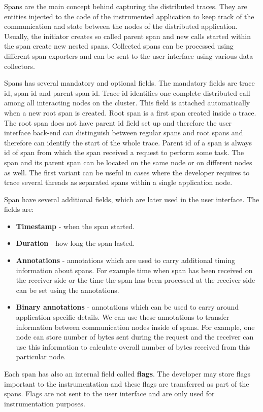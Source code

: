 Spans are the main concept behind capturing the distributed traces. They are entities injected to the code of the instrumented application to keep track of the communication and state between the nodes of the distributed application. Usually, the initiator creates so called parent span and new calls started within the span create new nested spans. Collected spans can be processed using different span exporters and can be sent to the user interface using various data collectors.

Spans has several mandatory and optional fields. The mandatory fields are trace id, span id and parent span id. Trace id identifies one complete distributed call among all interacting nodes on the cluster. This field is attached automatically when a new root span is created. Root span is a first span created inside a trace. The root span does not have parent id field set up and therefore the user interface back-end can distinguish between regular spans and root spans and therefore can identify the start of the whole trace. Parent id of a span is always id of span from which the span received a request to perform some task. The span and its parent span can be located on the same node or on different nodes as well. The first variant can be useful in cases where the developer requires to trace several threads as separated spans within a single application node.  

Span have several additional fields, which are later used in the user interface. The fields are:
\begin{itemize}
	\item \textbf{Timestamp} - when the span started.
	\item \textbf{Duration} - how long the span lasted.
	\item \textbf{Annotations} - annotations which are used to carry additional timing information about spans. For example time when span has been received on the receiver side or the time the span has been processed at the receiver side can be set using the annotations.
	\item \textbf{Binary annotations} - annotations which can be used to carry around application specific details. We can use these annotations to transfer information between communication nodes inside of spans. For example, one node can store number of bytes sent during the request and the receiver can use this information to calculate overall number of bytes received from this particular node.
\end{itemize}
Each span has also an internal field called \textbf{flags}. The developer may store flags important to the instrumentation and these flags are transferred as part of the spans. Flags are not sent to the user interface and are only used for instrumentation purposes.

